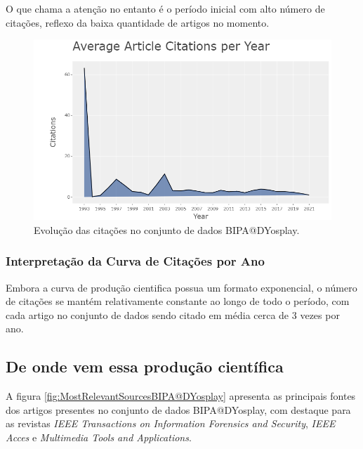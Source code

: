 O que chama a atenção no entanto é o período inicial com alto número de citações, reflexo da baixa quantidade de artigos no momento.

\begin{figure}[H]
    \centering
    \includegraphics[width=1\textwidth]{experiments/DYosplay/PesquisaBibliometrica/Imagens/BIPA@DYosplay_Avarage Citations per Year.png}
    \caption{Evolução das citações no conjunto de dados BIPA@DYosplay.}
    \label{fig:evol:anual:citacoes:BIPA@DYosplay}
\end{figure}

\subsubsection{Interpretação da Curva de Citações por Ano}

Embora a curva de produção cientifica possua um formato exponencial, o número de citações se mantém relativamente constante ao longo de todo o período, com cada artigo no conjunto de dados sendo citado em média cerca de 3 vezes por ano.

\subsection{De onde vem essa produção científica}
\label{sec:BIPA@DYosplay_OrigemProducao}
A figura \ref{fig:MostRelevantSourcesBIPA@DYosplay} apresenta as principais fontes dos artigos presentes no conjunto de dados BIPA@DYosplay, com destaque para as revistas \textit{IEEE Transactions on Information Forensics and Security}, \textit{IEEE Acces} e \textit{Multimedia Tools and Applications}.

